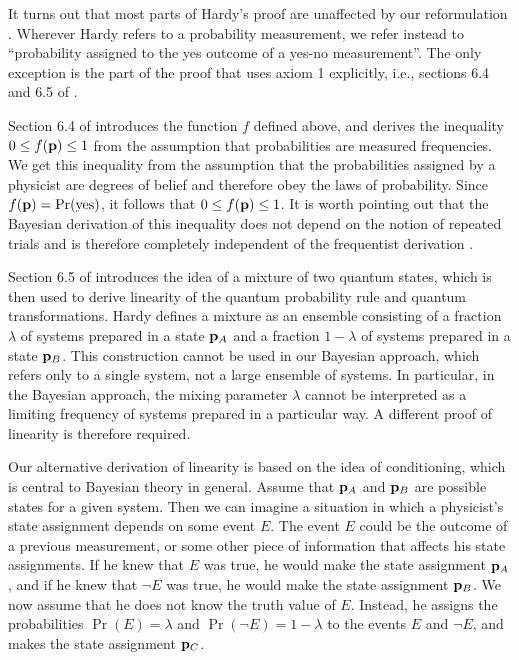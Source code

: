 \documentclass[pra,12pt,tightenlines]{revtex4-2}
\def\p{{\bf p}}
\def\yes{{\rm yes}}
\begin{document}
It turns out that most parts of Hardy's proof are unaffected by our
reformulation \cite{Hardy-private}. Wherever
Hardy refers to a probability measurement, we refer instead to ``probability
assigned to the yes outcome of a yes-no measurement''. The only exception is
the part of the proof that uses axiom 1 explicitly, i.e., sections 6.4 and 6.5
of \cite{Hardy-0101}.

Section 6.4 of \cite{Hardy-0101} introduces the function $f$ defined above,
and derives the inequality $0\le f(\p)\le1$ from the assumption that
probabilities are measured frequencies. We get this inequality from the
assumption that the probabilities assigned by a physicist are degrees of
belief and therefore obey the laws of probability. Since $f(\p)=\Pr(\yes)$, it
follows that $0\le f(\p)\le1$. It is worth pointing out that the Bayesian
derivation of this inequality does not depend on the notion
of repeated trials and is therefore completely independent of the frequentist
derivation \cite{Caves2002a}.

Section 6.5 of \cite{Hardy-0101} introduces the idea of a mixture of two
quantum states, which is then used to derive linearity of the quantum
probability rule and quantum transformations. Hardy defines a mixture as an
ensemble consisting of a fraction $\lambda$ of systems prepared in a state
$\p_A$ and a fraction $1-\lambda$ of systems prepared in a state $\p_B$. This
construction cannot be used in our Bayesian approach, which refers only to a
single system, not a large ensemble of systems. In particular, in the
Bayesian approach, the mixing parameter $\lambda$ cannot be interpreted as 
a limiting frequency of systems prepared in a particular way. A different proof
of linearity is therefore required.

Our alternative derivation of linearity is based on the idea of conditioning,
which is central to Bayesian theory in general.  Assume that $\p_A$ and $\p_B$
are possible states for a given system. Then we can imagine a situation in
which a physicist's state assignment depends on some event $E$.  The event $E$
could be the outcome of a previous measurement, or some other piece of
information that affects his state assignments. If he knew that $E$ was true,
he would make the state assignment $\p_A$, and if he knew that $\neg E$ was
true, he would make the state assignment $\p_B$. We now assume that he
does not know the truth value of $E$.  Instead, he assigns the probabilities
$\Pr(E)=\lambda$ and $\Pr(\neg E)=1-\lambda$ to the events $E$ and $\neg E$,
and makes the state assignment $\p_C$.
\end{document}
